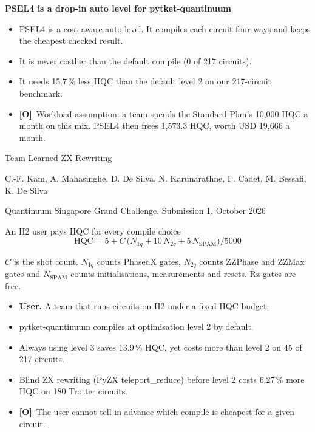 \documentclass[aspectratio=169,11pt]{beamer}
\newcommand{\Otag}{{\color{opinion}\textbf{[O]}}}
\begin{document}
\begin{frame}[plain]
  \vfill
  {\color{accent}\LARGE\bfseries PSEL4 is a drop-in auto level for pytket-quantinuum\par}
  \vspace{0.4cm}
  \begin{itemize}\setlength{\itemsep}{3pt}\large
    \item PSEL4 is a cost-aware auto level. It compiles each circuit four ways and keeps the cheapest checked result.
    \item It is never costlier than the default compile (0 of 217 circuits).
    \item It needs 15.7\,\% less HQC than the default level 2 on our 217-circuit benchmark.
    \item \Otag\ Workload assumption: a team spends the Standard Plan's 10,000 HQC a month on this mix. PSEL4 then frees 1,573.3 HQC, worth USD 19,666 a month.
  \end{itemize}
  \vspace{0.35cm}
  {\large Team Learned ZX Rewriting\par}
  \vspace{0.15cm}
  C.-F. Kam, A. Mahasinghe, D. De Silva, N. Karunarathne, F. Cadet, M. Bessafi, K. De Silva\par
  \vspace{0.3cm}
  {\color{muted}Quantinuum Singapore Grand Challenge, Submission 1, October 2026\par}
  \vfill
\end{frame}

\begin{frame}{An H2 user pays HQC for every compile choice}
  \small
  \[ \mathrm{HQC} = 5 + C\,\bigl(N_{1q} + 10\,N_{2q} + 5\,N_{\mathrm{SPAM}}\bigr) / 5000 \]
  {\footnotesize\color{muted}$C$ is the shot count. $N_{1q}$ counts PhasedX gates, $N_{2q}$ counts ZZPhase and ZZMax gates and $N_{\mathrm{SPAM}}$ counts initialisations, measurements and resets. Rz gates are free.\par}
  \medskip
  \begin{itemize}\setlength{\itemsep}{4pt}
    \item \textbf{User.} A team that runs circuits on H2 under a fixed HQC budget.
    \item pytket-quantinuum compiles at optimisation level 2 by default.
    \item Always using level 3 saves 13.9\,\% HQC, yet costs more than level 2 on 45 of 217 circuits.
    \item Blind ZX rewriting (PyZX teleport\_reduce) before level 2 costs 6.27\,\% more HQC on 180 Trotter circuits.
    \item \Otag\ The user cannot tell in advance which compile is cheapest for a given circuit.
  \end{itemize}
\end{frame}
\end{document}
